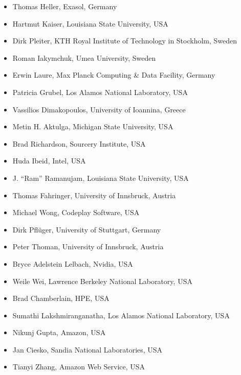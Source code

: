 \documentclass{article}
\begin{document}
\begin{itemize}

    \item Thomas Heller, Exasol, Germany
    \item Hartmut Kaiser, Louisiana State University, USA
    \item Dirk Pleiter, KTH Royal Institute of Technology in Stockholm, Sweden
    \item Roman Iakymchuk, Umea University, Sweden
    \item Erwin Laure, Max Planck Computing \& Data Facility, Germany
    \item Patricia Grubel, Los Alamos National Laboratory, USA
    \item Vassilios Dimakopoulos, University of Ioannina, Greece
    \item Metin H. Aktulga, Michigan State University, USA
    \item Brad Richardson, Sourcery Institute, USA
    \item Huda Ibeid, Intel, USA
    \item J. “Ram” Ramanujam, Louisiana State University, USA
    \item Thomas Fahringer, University of Innsbruck, Austria
    \item Michael Wong, Codeplay Software, USA
    \item Dirk Pflüger, University of Stuttgart, Germany
    \item Peter Thoman, University of Innsbruck, Austria
    \item Bryce Adelstein Lelbach, Nvidia, USA
    \item Weile Wei, Lawrence Berkeley National Laboratory, USA
    \item Brad Chamberlain, HPE, USA
    \item Sumathi Lakshmiranganatha, Los Alamos National Laboratory, USA
    \item Nikunj Gupta, Amazon, USA
    \item Jan Ciesko, Sandia National Laboratories, USA
   \item Tianyi Zhang, Amazon Web Service, USA
\end{itemize}

\end{document}
